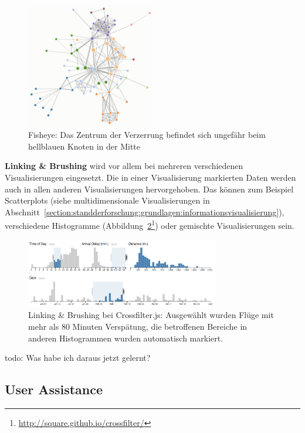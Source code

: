 \documentclass[
	headsepline,
	footsepline,
	fontsize=12pt,
	bibliography=totoc
]{scrbook}
\begin{document}
\begin{figure}[htbp]
   \centering
   \includegraphics[width=0.5\textwidth]{images/grundlagen-fisheye.png}
   \caption{Fisheye: Das Zentrum der Verzerrung befindet sich ungefähr beim hellblauen Knoten in der Mitte}
   \label{figure:fisheye}
\end{figure}


\textbf{Linking \& Brushing} wird vor allem bei mehreren verschiedenen Visualisierungen eingesetzt. Die in einer Visualisierung markierten Daten werden auch in allen anderen Visualisierungen hervorgehoben. Das können zum Beispiel Scatterplots (siehe multidimensionale Visualisierungen in Abschnitt~\ref{section:standderforschung:grundlagen:informationsvisualisierung}), verschiedene Histogramme (Abbildung~\ref{figure:link_brush}\footnote{\url{http://square.github.io/crossfilter/}}) oder gemischte Visualisierungen sein.

\begin{figure}[htbp]
   \centering
   \includegraphics[width=0.75\textwidth]{images/grundlagen-link_brush.png}
   \caption{Linking \& Brushing bei Crossfilter.js: Ausgewählt wurden Flüge mit mehr als 80 Minuten Verspätung, die betroffenen Bereiche in anderen Histogrammen wurden automatisch markiert.}
   \label{figure:link_brush}
\end{figure}

todo: Was habe ich daraus jetzt gelernt?

\subsection{User Assistance}
\label{section:standderforschung:grundlagen:user_assistance}
\end{document}
